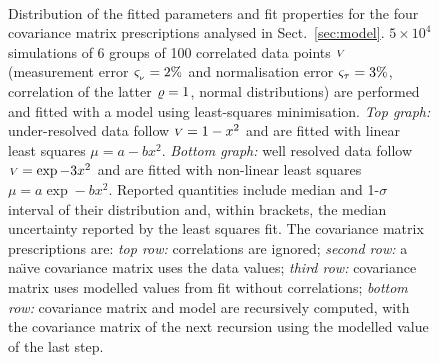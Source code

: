 \documentclass{pasa}
\begin{document}
\begin{figure}
\centering
{}\\
\caption{Distribution of the fitted parameters and fit properties for the four covariance matrix prescriptions analysed in Sect.~\ref{sec:model}. $5\times10^4$ simulations of 6 groups of 100 correlated data points ${\scriptstyle V}$ (measurement error $\varsigma_{_\nu} = 2\%$ and normalisation error $\varsigma_\tau = 3\%$, correlation of the latter $\varrho = 1$, normal distributions) are performed and fitted with a model using least-squares minimisation. \emph{Top graph:} under-resolved data follow ${\scriptstyle V} = 1-x^2$ and are fitted with linear least squares $\mu = a - bx^2$. \emph{Bottom graph:} well resolved data follow ${\scriptstyle V} = \exp -3x^2$ and are fitted with non-linear least squares $\mu = a\exp -bx^2$. Reported quantities include median and 1-$\sigma$ interval of their distribution and, within brackets, the median uncertainty reported by the least squares fit. 
The covariance matrix prescriptions  are: \emph{top row:} correlations are ignored; \emph{second row:} a na\"\i{}ve covariance matrix uses the data values; \emph{third row:} covariance matrix uses modelled values from fit without correlations; \emph{bottom row:} covariance matrix and model are recursively computed, with the covariance matrix of the next recursion using the modelled value of the last step. }
\end{figure}
\end{document}
